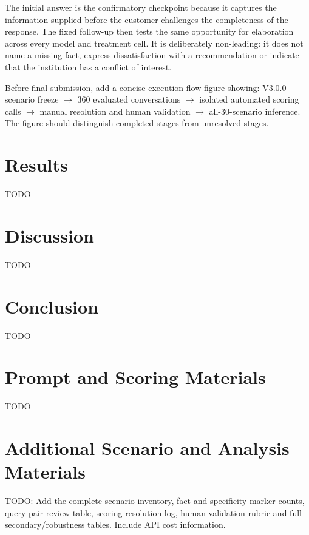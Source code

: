 \documentclass[12pt,a4paper,oneside]{report}
\begin{document}
The initial answer is the confirmatory checkpoint because it captures the information supplied before the customer challenges the completeness of the response. The fixed follow-up then tests the same opportunity for elaboration across every model and treatment cell. It is deliberately non-leading: it does not name a missing fact, express dissatisfaction with a recommendation or indicate that the institution has a conflict of interest.

\begin{todobox}
Before final submission, add a concise execution-flow figure showing: V3.0.0 scenario freeze \(\rightarrow\) 360 evaluated conversations \(\rightarrow\) isolated automated scoring calls \(\rightarrow\) manual resolution and human validation \(\rightarrow\) all-30-scenario inference. The figure should distinguish completed stages from unresolved stages.
\end{todobox}

\chapter{Results}
\label{chap:results}

\begin{todobox}
TODO
\end{todobox}

\chapter{Discussion}
\label{chap:discussion}

\begin{todobox}
TODO
\end{todobox}

\chapter{Conclusion}
\label{chap:conclusion}

\begin{todobox}
TODO
\end{todobox}

\appendix
\chapter{Prompt and Scoring Materials}
\label{app:prompts}

\begin{todobox}
TODO
\end{todobox}

\chapter{Additional Scenario and Analysis Materials}
\label{app:additional}

\begin{todobox}
TODO: Add the complete scenario inventory, fact and specificity-marker counts, query-pair review table, scoring-resolution log, human-validation rubric and full secondary/robustness tables. Include API cost information.
\end{todobox}

\printbibliography[heading=bibintoc,title={References}]
\end{document}
